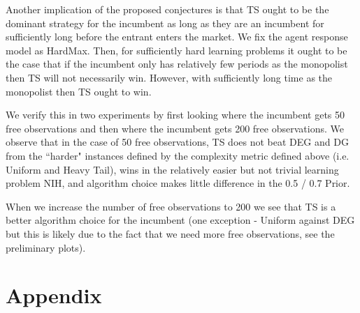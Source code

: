 \documentclass[11pt,letterpaper]{article}
\begin{document}
Another implication of the proposed conjectures is that TS ought to be the dominant strategy for the incumbent as long as they are an incumbent for sufficiently long before the entrant enters the market. We fix the agent response model as HardMax. Then, for sufficiently hard learning problems it ought to be the case that if the incumbent only has relatively few periods as the monopolist then TS will not necessarily win. However, with sufficiently long time as the monopolist then TS ought to win.

We verify this in two experiments by first looking where the incumbent gets 50 free observations and then where the incumbent gets 200 free observations. We observe that in the case of 50 free observations, TS does not beat DEG and DG from the ``harder" instances defined by the complexity metric defined above (i.e. Uniform and Heavy Tail), wins in the relatively easier but not trivial learning problem NIH, and algorithm choice makes little difference in the 0.5 / 0.7 Prior.

When we increase the number of free observations to 200 we see that TS is a better algorithm choice for the incumbent (one exception - Uniform against DEG but this is likely due to the fact that we need more free observations, see the preliminary plots).




\section*{Appendix}
\end{document}
